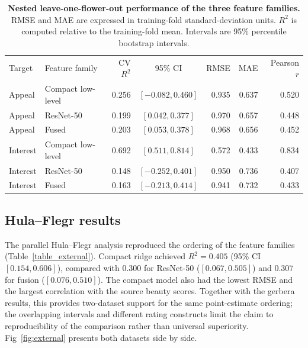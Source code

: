 \documentclass[10pt,letterpaper]{article}
\newlength\savedwidth
\newcommand\thickhline{\noalign{\global\savedwidth\arrayrulewidth\global\arrayrulewidth 2pt}\hline\noalign{\global\arrayrulewidth\savedwidth}}
\begin{document}
\begin{table}[!ht]
\centering
\caption{\textbf{Nested leave-one-flower-out performance of the three feature families.} RMSE and MAE are expressed in training-fold standard-deviation units. $R^2$ is computed relative to the training-fold mean. Intervals are 95\% percentile bootstrap intervals.}
\begin{tabular}{l l r c r r r}
\hline
Target & Feature family & CV $R^2$ & 95\% CI & RMSE & MAE & Pearson $r$\\ 
\thickhline
Appeal & Compact low-level & 0.256 & $[-0.082, 0.460]$  & 0.935 & 0.637 & 0.520\\
Appeal & ResNet-50 & 0.199 & $[0.042, 0.377]$ & 0.970 & 0.657 & 0.448\\
Appeal & Fused & 0.203 & $[0.053, 0.378]$ & 0.968 & 0.656 & 0.452\\
Interest & Compact low-level & 0.692 & $[0.511, 0.814]$ & 0.572 & 0.433 & 0.834\\
Interest & ResNet-50       & 0.148 & $[-0.252, 0.401]$ & 0.950 & 0.736 & 0.407\\
Interest & Fused           & 0.163 & $[-0.213, 0.414]$ & 0.941 & 0.732 & 0.433\\

\hline
\end{tabular}
\label{table_features}
\end{table}

    
   


\subsection*{Hula--Flegr results}
The parallel Hula--Flegr analysis reproduced the ordering of the feature families (Table~\ref{table_external}). Compact ridge achieved $R^2=0.405$ (95\% CI $[0.154, 0.606]$), compared with $0.300$ for ResNet-50 ($[0.067, 0.505]$) and $0.307$ for fusion ($[0.076, 0.510]$). The compact model also had the lowest RMSE and the largest correlation with the source beauty scores. Together with the gerbera results, this provides two-dataset support for the same point-estimate ordering; the overlapping intervals and different rating constructs limit the claim to reproducibility of the comparison rather than universal superiority. Fig~\ref{fig:external} presents both datasets side by side.
\end{document}
